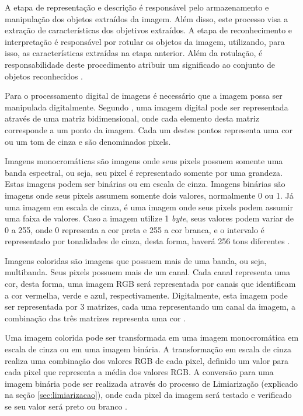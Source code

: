 \documentclass[
	12pt,				%
	oneside,			%
	a4paper,			%
	english,			%
	french,				%
	spanish,			%
	brazil,				%
	]{abntex2}
\begin{document}
A etapa de representação e descrição é responsável pelo armazenamento e manipulação dos objetos extraídos da imagem. Além disso, este processo visa a extração de características dos objetivos extraídos. A etapa de reconhecimento e interpretação é responsável por rotular os objetos da imagem, utilizando, para isso, as características extraídas na etapa anterior. Além da rotulação, é responsabilidade deste procedimento atribuir um significado ao conjunto de objetos reconhecidos \cite{pedriniSchwartz:2008}. 

Para o processamento digital de imagens é necessário que a imagem possa ser manipulada digitalmente. Segundo \citet{pedriniSchwartz:2008}, uma imagem digital pode ser representada através de uma matriz bidimensional, onde cada elemento desta matriz corresponde a um ponto da imagem. Cada um destes pontos representa uma cor ou um tom de cinza e são denominados pixels. 

Imagens monocromáticas são imagens onde seus pixels possuem somente uma banda espectral, ou seja, seu pixel é representado somente por uma grandeza. Estas imagens podem ser binárias ou em escala de cinza. Imagens binárias são imagens onde seus pixels assumem somente dois valores, normalmente 0 ou 1. Já uma imagem em escala de cinza, é uma imagem onde seus pixels podem assumir uma faixa de valores. Caso a imagem utilize 1 \textit{byte}, seus valores podem variar de 0 a 255, onde 0 representa a cor preta e 255 a cor branca, e o intervalo é representado por tonalidades de cinza, desta forma, haverá 256 tons diferentes \cite{conciAzevedoLeta:2008}.

Imagens coloridas são imagens que possuem mais de uma banda, ou seja, multibanda. Seus pixels possuem mais de um canal. Cada canal representa uma cor, desta forma, uma imagem RGB será representada por canais que identificam a cor vermelha, verde e azul, respectivamente. Digitalmente, esta imagem pode ser representada por 3 matrizes, cada uma representando um canal da imagem, a combinação das três matrizes representa uma cor \cite{conciAzevedoLeta:2008}.

Uma imagem colorida pode ser transformada em uma imagem monocromática em escala de cinza ou em uma imagem binária. A transformação em escala de cinza realiza uma combinação dos valores RGB de cada pixel, definido um valor para cada pixel que representa a média dos valores RGB. A conversão para uma imagem binária pode ser realizada através do processo de Limiarização (explicado na seção \ref{sec:limiarizacao}), onde cada pixel da imagem será testado e verificado se seu valor será preto ou branco \cite{mossmann2010extraccao}.
\end{document}
